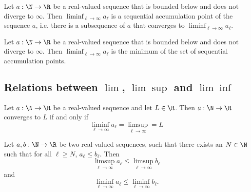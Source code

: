 \begin{theorem}
    Let $a: \N \to \R$ be a real-valued sequence that is bounded below and does not diverge to $\infty$. Then
    $\liminf_{\ell\to\infty}a_\ell$ is a sequential accumulation point of the sequence $a$, i.e. there is a
    subsequence of $a$ that converges to $\liminf_{\ell\to\infty}a_\ell$.
\end{theorem}

\begin{theorem}
    Let $a: \N \to \R$ be a real-valued sequence that is bounded below and does not diverge to $\infty$. Then
    $\liminf_{\ell\to\infty}a_\ell$ is the minimum of the set of sequential accumulation points.
\end{theorem}

\subsection{Relations between $\lim$, $\lim\sup$ and $\lim\inf$}
\begin{proposition}
    Let $a: \N \to \R$ be a real-valued sequence and let $L \in \R$. Then $a: \N \to \R$ converges to $L$ if and only if
    $$\liminf_{\ell\to\infty}a_\ell = \limsup_{\ell\to\infty} = L$$
\end{proposition}

\begin{proposition}
    Let $a,b: \N \to \R$ be two real-valued sequences, such that there exists an $N \in \N$ such that for all $\ell \ge N$,
    $a_\ell \le b_\ell.$ Then
    $$\limsup_{\ell\to\infty}a_\ell \le \limsup_{\ell\to\infty}b_\ell$$ and 
    $$\liminf_{\ell\to\infty}a_\ell \le \liminf_{\ell\to\infty}b_\ell.$$
\end{proposition}
